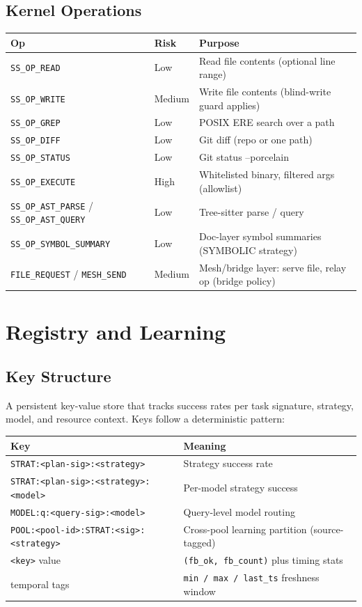 \documentclass[11pt,a4paper]{article}
\begin{document}
\subsection{Kernel Operations}
\begin{center}
\begin{tabularx}{\textwidth}{l l X}
\toprule
\textbf{Op} & \textbf{Risk} & \textbf{Purpose} \\
\midrule
\texttt{SS\_OP\_READ} & Low & Read file contents (optional line range) \\
\texttt{SS\_OP\_WRITE} & Medium & Write file contents (blind-write guard applies) \\
\texttt{SS\_OP\_GREP} & Low & POSIX ERE search over a path \\
\texttt{SS\_OP\_DIFF} & Low & Git diff (repo or one path) \\
\texttt{SS\_OP\_STATUS} & Low & Git status --porcelain \\
\texttt{SS\_OP\_EXECUTE} & High & Whitelisted binary, filtered args (allowlist) \\
\texttt{SS\_OP\_AST\_PARSE} / \texttt{SS\_OP\_AST\_QUERY} & Low & Tree-sitter parse / query \\
\texttt{SS\_OP\_SYMBOL\_SUMMARY} & Low & Doc-layer symbol summaries (SYMBOLIC strategy) \\
\texttt{FILE\_REQUEST} / \texttt{MESH\_SEND} & Medium & Mesh/bridge layer: serve file, relay op (bridge policy) \\
\bottomrule
\end{tabularx}
\end{center}

\section{Registry and Learning}
\subsection{Key Structure}
A persistent key-value store that tracks success rates per task signature, strategy, model, and resource context. Keys follow a deterministic pattern:

\begin{center}
\begin{tabularx}{\textwidth}{l X}
\toprule
\textbf{Key} & \textbf{Meaning} \\
\midrule
\texttt{STRAT:<plan-sig>:<strategy>} & Strategy success rate \\
\texttt{STRAT:<plan-sig>:<strategy>:<model>} & Per-model strategy success \\
\texttt{MODEL:q:<query-sig>:<model>} & Query-level model routing \\
\texttt{POOL:<pool-id>:STRAT:<sig>:<strategy>} & Cross-pool learning partition (source-tagged) \\
\texttt{<key>} value & \texttt{(fb\_ok, fb\_count)} plus timing stats \\
temporal tags & \texttt{min / max / last\_ts} freshness window \\
\bottomrule
\end{tabularx}
\end{center}
\end{document}
